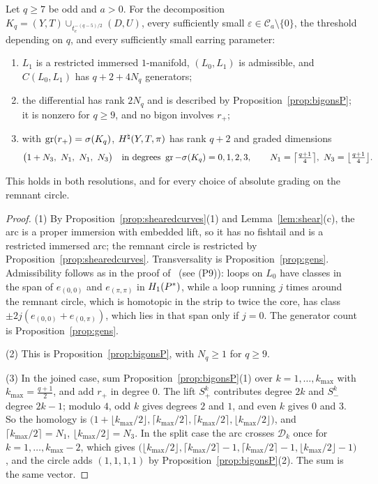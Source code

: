 \begin{theorem}\label{thm:pillowP}
Let $q\ge7$ be odd and $a>0$. For the decomposition $K_q=(Y,T)\cup_{t_e^{-(q-5)/2}}(D,U)$, every sufficiently small
$\varepsilon\in\mathcal C_a\setminus\{0\}$, the threshold depending on $q$, and every sufficiently small earring parameter:
\begin{enumerate}
\item $L_1$ is a restricted immersed $1$-manifold, $(L_0,L_1)$ is admissible, and $C(L_0,L_1)$ has $q+2+4N_q$ generators;
\item the differential has rank $2N_q$ and is described by Proposition~\ref{prop:bigonsP}; it is nonzero for $q\ge9$, and no
bigon involves $r_+$;
\item with $\operatorname{gr}(r_+)=\sigma(K_q)$, $H^{\natural}(Y,T,\pi)$ has rank $q+2$ and graded dimensions
\[
\bigl(1+N_3,\ N_1,\ N_1,\ N_3\bigr)\quad\text{in degrees }\gr-\sigma(K_q)=0,1,2,3,\qquad N_1=\bigl\lceil\tfrac{q+1}4\bigr\rceil,\ N_3=\bigl\lfloor\tfrac{q+1}4\bigr\rfloor .
\]
\end{enumerate}
This holds in both resolutions, and for every choice of absolute grading on the remnant circle.
\end{theorem}

\begin{proof}
(1) By Proposition~\ref{prop:shearedcurves}(1) and Lemma~\ref{lem:shear}(c), the arc is a proper immersion with embedded
lift, so it has no fishtail and is a restricted immersed arc; the remnant circle is restricted by Proposition~\ref{prop:shearedcurves}. Transversality is
Proposition~\ref{prop:gens}. Admissibility follows as in the proof of~\cite[Lemma~6.6]{WuebbenV} (see (P9)): loops on $L_0$ have classes in the span of
$e_{(0,0)}$ and $e_{(\pi,\pi)}$ in $H_1(P^{*})$, while a loop running $j$ times around the remnant circle, which is homotopic in the
strip to twice the core, has class $\pm2j(e_{(0,0)}+e_{(0,\pi)})$, which lies in that span only if $j=0$. The generator count is
Proposition~\ref{prop:gens}.

(2) This is Proposition~\ref{prop:bigonsP}, with $N_q\ge1$ for $q\ge9$.

(3) In the joined case, sum Proposition~\ref{prop:bigonsP}(1) over $k=1,\dots,k_{\max}$ with $k_{\max}=\frac{q+1}2$, and add $r_+$ in degree
$0$. The lift $S^k_+$ contributes degree $2k$ and $S^k_-$ degree $2k-1$; modulo $4$, odd $k$ gives degrees $2$ and $1$, and
even $k$ gives $0$ and $3$. So the homology is
$\bigl(1+\lfloor k_{\max}/2\rfloor,\lceil k_{\max}/2\rceil,\lceil k_{\max}/2\rceil,\lfloor k_{\max}/2\rfloor\bigr)$, and
$\lceil k_{\max}/2\rceil=N_1$, $\lfloor k_{\max}/2\rfloor=N_3$. In the split case the arc crosses $\mathcal D_k$ once for
$k=1,\dots,k_{\max}-2$, which gives
$\bigl(\lfloor k_{\max}/2\rfloor,\lceil k_{\max}/2\rceil-1,\lceil k_{\max}/2\rceil-1,\lfloor k_{\max}/2\rfloor-1\bigr)$, and the circle adds $(1,1,1,1)$ by
Proposition~\ref{prop:bigonsP}(2). The sum is the same vector.
\end{proof}


